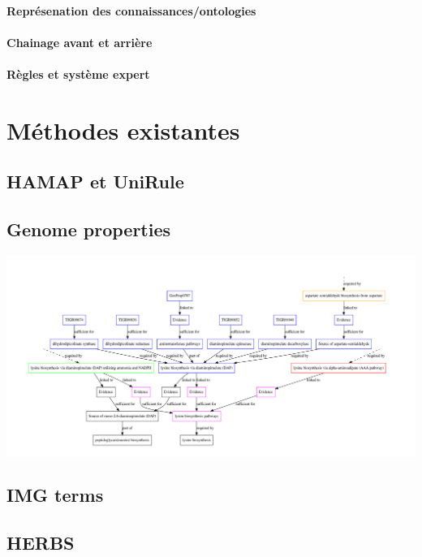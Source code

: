 \begin{refsegment}
    \paragraph{Représenation des connaissances/ontologies}
    \paragraph{Chainage avant et arrière} %
    \paragraph{Règles et système expert}
    
    \section{Méthodes existantes}
    \subsection{HAMAP et UniRule}
    \subsection{Genome properties}
    \begin{shadedfigure}
        \centering
        \includegraphics[width=\textwidth]{img/lysine_biosynthesis.pdf}
        \caption{  }
        \label{fig:gp_lysine}
    \end{shadedfigure}
    
    \subsection{IMG terms}
    \subsection{HERBS}
    
    \subbibliography
\end{refsegment}
